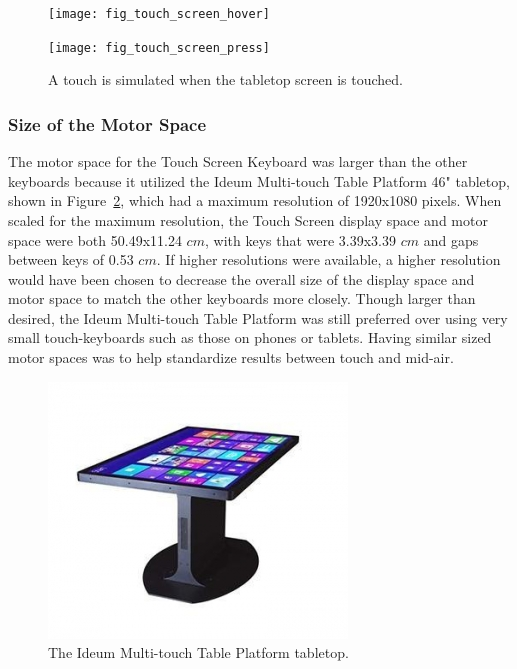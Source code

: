 \begin{figure}[h]
	\centering
	\begin{minipage}[t]{5.8in}
		\begin{minipage}[t]{2.85in}
			\texttt{[image: fig\_touch\_screen\_hover]}
		\end{minipage}
		\begin{minipage}[t]{2.9in}
			\texttt{[image: fig\_touch\_screen\_press]}
		\end{minipage}
	\end{minipage}
	\caption[Touch Screen Word Separation]{A touch is simulated when the tabletop screen is touched.}
	\label{touch_screen_press_comparison}
\end{figure}

\subsubsection{Size of the Motor Space}
The motor space for the Touch Screen Keyboard was larger than the other keyboards because it utilized the Ideum Multi-touch Table Platform 46" tabletop, shown in Figure~\ref{fig_ideum}, which had a maximum resolution of 1920x1080 pixels. When scaled for the maximum resolution, the Touch Screen display space and motor space were both 50.49x11.24 $cm$, with keys that were 3.39x3.39 $cm$ and gaps between keys of 0.53 $cm$. If higher resolutions were available, a higher resolution would have been chosen to decrease the overall size of the display space and motor space to match the other keyboards more closely. Though larger than desired, the Ideum Multi-touch Table Platform was still preferred over using very small touch-keyboards such as those on phones or tablets. Having similar sized motor spaces was to help standardize results between touch and mid-air.

\begin{figure}[h]
	\centering
	\includegraphics{fig_ideum}
	\caption[Ideum Multi-touch Table Platform]{The Ideum Multi-touch Table Platform tabletop.}
	\label{fig_ideum}
\end{figure}

